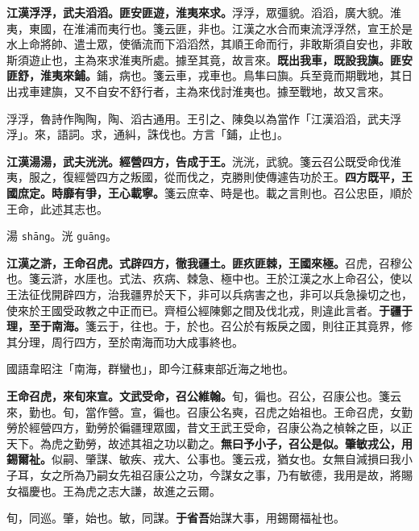 \textbf{江漢浮浮，武夫滔滔。匪安匪遊，淮夷來求。}{\footnotesize 浮浮，眾彊貌。滔滔，廣大貌。淮夷，東國，在淮浦而夷行也。箋云匪，非也。江漢之水合而東流浮浮然，宣王於是水上命將帥、遣士眾，使循流而下滔滔然，其順王命而行，非敢斯須自安也，非敢斯須遊止也，主為來求淮夷所處。據至其竟，故言來。}\textbf{既出我車，既設我旟。匪安匪舒，淮夷來鋪。}{\footnotesize 鋪，病也。箋云車，戎車也。鳥隼曰旟。兵至竟而期戰地，其日出戎車建旟，又不自安不舒行者，主為來伐討淮夷也。據至戰地，故又言來。}

\begin{quoting}浮浮，魯詩作陶陶，陶、滔古通用。王引之、陳奐以為當作「江漢滔滔，武夫浮浮」。來，語詞。求，通糾，誅伐也。方言「鋪，止也」。\end{quoting}

\textbf{江漢湯湯，武夫洸洸。經營四方，告成于王。}{\footnotesize 洸洸，武貌。箋云召公既受命伐淮夷，服之，復經營四方之叛國，從而伐之，克勝則使傳遽告功於王。}\textbf{四方既平，王國庶定。時靡有爭，王心載寧。}{\footnotesize 箋云庶幸、時是也。載之言則也。召公忠臣，順於王命，此述其志也。}

\begin{quoting}湯 \texttt{shāng}。洸 \texttt{guāng}。\end{quoting}

\textbf{江漢之滸，王命召虎。式辟四方，徹我疆土。匪疚匪棘，王國來極。}{\footnotesize 召虎，召穆公也。箋云滸，水厓也。式法、疚病、棘急、極中也。王於江漢之水上命召公，使以王法征伐開辟四方，治我疆界於天下，非可以兵病害之也，非可以兵急操切之也，使來於王國受政教之中正而已。齊桓公經陳鄭之間及伐北戎，則違此言者。}\textbf{于疆于理，至于南海。}{\footnotesize 箋云于，往也。于，於也。召公於有叛戾之國，則往正其竟界，修其分理，周行四方，至於南海而功大成事終也。}

\begin{quoting}國語韋昭注「南海，群蠻也」，即今江蘇東部近海之地也。\end{quoting}

\textbf{王命召虎，來旬來宣。文武受命，召公維翰。}{\footnotesize 旬，徧也。召公，召康公也。箋云來，勤也。旬，當作營。宣，徧也。召康公名奭，召虎之始祖也。王命召虎，女勤勞於經營四方，勤勞於徧疆理眾國，昔文王武王受命，召康公為之楨榦之臣，以正天下。為虎之勤勞，故述其祖之功以勸之。}\textbf{無曰予小子，召公是似。肇敏戎公，用錫爾祉。}{\footnotesize 似嗣、肇謀、敏疾、戎大、公事也。箋云戎，猶女也。女無自減損曰我小子耳，女之所為乃嗣女先祖召康公之功，今謀女之事，乃有敏德，我用是故，將賜女福慶也。王為虎之志大謙，故進之云爾。}

\begin{quoting}旬，同巡。肇，始也。敏，同謀。\textbf{于省吾}始謀大事，用錫爾福祉也。\end{quoting}

